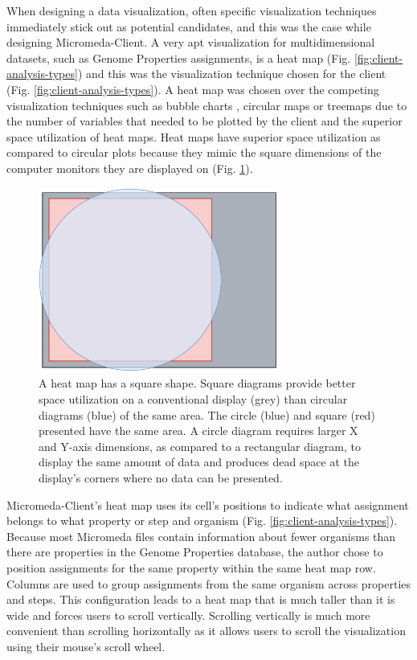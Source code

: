 When designing a data visualization, often specific visualization techniques immediately stick out as potential candidates, and this was the case while designing Micromeda-Client. A very apt visualization for multidimensional datasets, such as Genome Properties assignments, is a heat map \cite{wilkinson2009history,tufte2001visual}(Fig. \ref{fig:client-analysis-types}) and this was the visualization technique chosen for the client (Fig. \ref{fig:client-analysis-types}). A heat map was chosen over the competing visualization techniques such as bubble charts \cite{tufte2001visual}, circular maps \cite{ward2002taxonomy,stothard2004circular} or treemaps \cite{shneiderman1998tree} due to the number of variables that needed to be plotted by the client and the superior space utilization of heat maps. Heat maps have superior space utilization as compared to circular plots because they mimic the square dimensions of the computer monitors they are displayed on (Fig. \ref{fig:circle-square}).

\begin{figure}[!ht]
  \centering
	\includegraphics[width=0.7\textwidth]{media/square_vs_circle.pdf}
	 \caption{A heat map has a square shape. Square diagrams provide better space utilization on a conventional display (grey) than circular diagrams (blue) of the same area. The circle (blue) and square (red) presented have the same area. A circle diagram requires larger X and Y-axis dimensions, as compared to a rectangular diagram, to display the same amount of data and produces dead space at the display's corners where no data can be presented.}
	 \label{fig:circle-square}
\end{figure}

Micromeda-Client's heat map uses its cell's positions to indicate what assignment belongs to what property or step and organism (Fig. \ref{fig:client-analysis-types}). Because most Micromeda files contain information about fewer organisms than there are properties in the Genome Properties database, the author chose to position assignments for the same property within the same heat map row. Columns are used to group assignments from the same organism across properties and steps. This configuration leads to a heat map that is much taller than it is wide and forces users to scroll vertically. Scrolling vertically is much more convenient than scrolling horizontally as it allows users to scroll the visualization using their mouse's scroll wheel.


